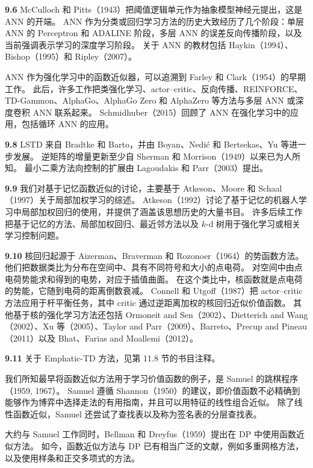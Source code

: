 \documentclass[UTF8, 12pt, fontset=fandol, oneside]{ctexart}
\begin{document}
\noindent\textbf{9.6}
McCulloch 和 Pitts（1943）把阈值逻辑单元作为抽象模型神经元提出，这是 ANN 的开端。
ANN 作为分类或回归学习方法的历史大致经历了几个阶段：单层 ANN 的 Perceptron 和 ADALINE 阶段，多层 ANN 的误差反向传播阶段，以及当前强调表示学习的深度学习阶段。
关于 ANN 的教材包括 Haykin（1994）、Bishop（1995）和 Ripley（2007）。

ANN 作为强化学习中的函数近似器，可以追溯到 Farley 和 Clark（1954）的早期工作。
此后，许多工作把类强化学习、actor--critic、反向传播、REINFORCE、TD-Gammon、AlphaGo、AlphaGo Zero 和 AlphaZero 等方法与多层 ANN 或深度卷积 ANN 联系起来。
Schmidhuber（2015）回顾了 ANN 在强化学习中的应用，包括循环 ANN 的应用。

\noindent\textbf{9.8}
LSTD 来自 Bradtke 和 Barto，并由 Boyan、Nedić 和 Bertsekas、Yu 等进一步发展。
逆矩阵的增量更新至少自 Sherman 和 Morrison（1949）以来已为人所知。
最小二乘方法向控制的扩展由 Lagoudakis 和 Parr（2003）提出。

\noindent\textbf{9.9}
我们对基于记忆函数近似的讨论，主要基于 Atkeson、Moore 和 Schaal（1997）关于局部加权学习的综述。
Atkeson（1992）讨论了基于记忆的机器人学习中局部加权回归的使用，并提供了涵盖该思想历史的大量书目。
许多后续工作把基于记忆的方法、局部加权回归、最近邻方法以及 $k$-d 树用于强化学习或相关学习控制问题。

\noindent\textbf{9.10}
核回归起源于 Aizerman、Braverman 和 Rozonoer（1964）的势函数方法。
他们把数据类比为分布在空间中、具有不同符号和大小的点电荷。
对空间中由点电荷势能求和得到的电势，对应于插值曲面。
在这个类比中，核函数就是点电荷的势能，它随到电荷的距离倒数衰减。
Connell 和 Utgoff（1987）把 actor--critic 方法应用于杆平衡任务，其中 critic 通过逆距离加权的核回归近似价值函数。
其他基于核的强化学习方法还包括 Ormoneit and Sen（2002）、Dietterich and Wang（2002）、Xu 等（2005）、Taylor and Parr（2009）、Barreto、Precup and Pineau（2011）以及 Bhat、Farias and Moallemi（2012）。

\noindent\textbf{9.11}
关于 Emphatic-TD 方法，见第 11.8 节的书目注释。

我们所知最早将函数近似方法用于学习价值函数的例子，是 Samuel 的跳棋程序（1959, 1967）。
Samuel 遵循 Shannon（1950）的建议，即价值函数不必精确到能够作为博弈中选择走法的有用指南，并且可以用特征的线性组合近似。
除了线性函数近似，Samuel 还尝试了查找表以及称为签名表的分层查找表。

大约与 Samuel 工作同时，Bellman 和 Dreyfus（1959）提出在 DP 中使用函数近似方法。
如今，函数近似方法与 DP 已有相当广泛的文献，例如多重网格方法，以及使用样条和正交多项式的方法。
\end{document}
